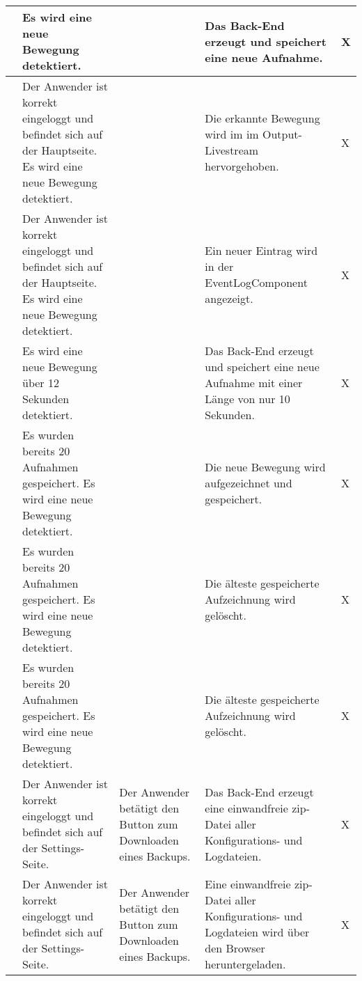 \begin{longtable}{| p{} | p{} | p{} | p{} | p{} |}
	\stepcounter{SysTestNumber}\arabic{SysTestNumber} & Es wird eine neue Bewegung detektiert. & & Das Back-End erzeugt und speichert eine neue Aufnahme. & X \\ \hline
	
	\stepcounter{SysTestNumber}\arabic{SysTestNumber} & Der Anwender ist korrekt eingeloggt und befindet sich auf der Hauptseite. Es wird eine neue Bewegung detektiert. & & Die erkannte Bewegung wird im im Output-Livestream hervorgehoben. & X \\ \hline
	
	\stepcounter{SysTestNumber}\arabic{SysTestNumber} & Der Anwender ist korrekt eingeloggt und befindet sich auf der Hauptseite. Es wird eine neue Bewegung detektiert. & & Ein neuer Eintrag wird in der EventLogComponent angezeigt. & X \\ \hline
	
	\stepcounter{SysTestNumber}\arabic{SysTestNumber} & Es wird eine neue Bewegung über 12 Sekunden detektiert. & & Das Back-End erzeugt und speichert eine neue Aufnahme mit einer Länge von nur 10 Sekunden. & X \\ \hline
	
	\stepcounter{SysTestNumber}\arabic{SysTestNumber} & Es wurden bereits 20 Aufnahmen gespeichert. Es wird eine neue Bewegung detektiert. & & Die neue Bewegung wird aufgezeichnet und gespeichert. & X \\ \hline
	
	\stepcounter{SysTestNumber}\arabic{SysTestNumber} & Es wurden bereits 20 Aufnahmen gespeichert. Es wird eine neue Bewegung detektiert. & & Die älteste gespeicherte Aufzeichnung wird gelöscht. & X \\ \hline
	
	\stepcounter{SysTestNumber}\arabic{SysTestNumber} & Es wurden bereits 20 Aufnahmen gespeichert. Es wird eine neue Bewegung detektiert. & & Die älteste gespeicherte Aufzeichnung wird gelöscht. & X \\ \hline
	
	\stepcounter{SysTestNumber}\arabic{SysTestNumber} & Der Anwender ist korrekt eingeloggt und befindet sich auf der Settings-Seite. & Der Anwender betätigt den Button zum Downloaden eines Backups. & Das Back-End erzeugt eine einwandfreie zip-Datei aller Konfigurations- und Logdateien. & X \\ \hline
	
	\stepcounter{SysTestNumber}\arabic{SysTestNumber} & Der Anwender ist korrekt eingeloggt und befindet sich auf der Settings-Seite. & Der Anwender betätigt den Button zum Downloaden eines Backups. & Eine einwandfreie zip-Datei aller Konfigurations- und Logdateien wird über den Browser heruntergeladen. & X \\ \hline
	

\end{longtable}
